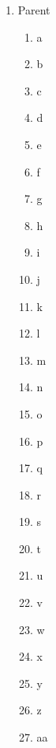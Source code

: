 \documentclass{article}
\begin{document}
\begin{enumerate}
\item Parent
\begin{enumerate}[start=1]
\item a
\item b
\item c
\item d
\item e
\item f
\item g
\item h
\item i
\item j
\item k
\item l
\item m
\item n
\item o
\item p
\item q
\item r
\item s
\item t
\item u
\item v
\item w
\item x
\item y
\item z
\item aa
\end{enumerate}
\end{enumerate}
\end{document}
